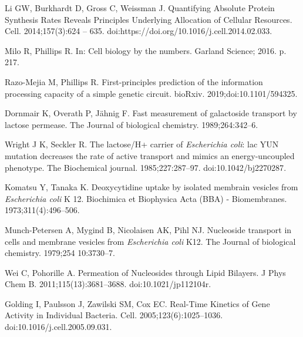 \documentclass[10pt,letterpaper]{article}
\begin{document}
\begin{thebibliography}{10}
	Li GW, Burkhardt D, Gross C, Weissman J.
	\newblock Quantifying Absolute Protein Synthesis Rates Reveals Principles
	Underlying Allocation of Cellular Resources.
	\newblock Cell. 2014;157(3):624 -- 635.
	\newblock doi:{https://doi.org/10.1016/j.cell.2014.02.033}.
	
	Milo R, Phillips R.
	\newblock In: Cell biology by the numbers. Garland Science; 2016. p. 217.
	
	Razo-Mejia M, Phillips R.
	\newblock First-principles prediction of the information processing capacity of
	a simple genetic circuit.
	\newblock bioRxiv. 2019;doi:{10.1101/594325}.
	
	Dornmair K, Overath P, Jähnig F.
	\newblock Fast measurement of galactoside transport by lactose permease.
	\newblock The Journal of biological chemistry. 1989;264:342--6.
	
	Wright J K, Seckler R.
	\newblock The lactose/H+ carrier of \emph{Escherichia coli}: lac YUN mutation
	decreases the rate of active transport and mimics an energy-uncoupled
	phenotype.
	\newblock The Biochemical journal. 1985;227:287--97.
	\newblock doi:{10.1042/bj2270287}.
	
	Komatsu Y, Tanaka K.
	\newblock Deoxycytidine uptake by isolated membrain vesicles from
	\emph{Escherichia coli} K 12.
	\newblock Biochimica et Biophysica Acta (BBA) - Biomembranes.
	1973;311(4):496--506.
	
	Munch-Petersen A, Mygind B, Nicolaisen AK, Pihl NJ.
	\newblock Nucleoside transport in cells and membrane vesicles from
	\emph{Escherichia coli} K12.
	\newblock The Journal of biological chemistry. 1979;254 10:3730--7.
	
	Wei C, Pohorille A.
	\newblock Permeation of Nucleosides through Lipid Bilayers.
	\newblock J Phys Chem B. 2011;115(13):3681--3688.
	\newblock doi:{10.1021/jp112104r}.
	
	Golding I, Paulsson J, Zawilski SM, Cox EC.
	\newblock Real-Time Kinetics of Gene Activity in Individual Bacteria.
	\newblock Cell. 2005;123(6):1025--1036.
	\newblock doi:{10.1016/j.cell.2005.09.031}.
	
\end{thebibliography}
\end{document}
